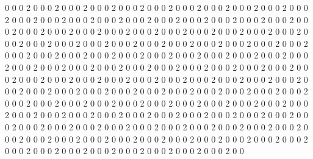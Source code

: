 0
0
0
2
0
0
0
2
0
0
0
2
0
0
0
2
0
0
0
2
0
0
0
2
0
0
0
2
0
0
0
2
0
0
0
2
0
0
0
2
0
0
0
2
0
0
0
2
0
0
0
2
0
0
0
2
0
0
0
2
0
0
0
2
0
0
0
2
0
0
0
2
0
0
0
2
0
0
0
2
0
0
0
2
0
0
0
2
0
0
0
2
0
0
0
2
0
0
0
2
0
0
0
2
0
0
0
2
0
0
0
2
0
0
0
2
0
0
0
2
0
0
0
2
0
0
0
2
0
0
0
2
0
0
0
2
0
0
0
2
0
0
0
2
0
0
0
2
0
0
0
2
0
0
0
2
0
0
0
2
0
0
0
2
0
0
0
2
0
0
0
2
0
0
0
2
0
0
0
2
0
0
0
2
0
0
0
2
0
0
0
2
0
0
0
2
0
0
0
2
0
0
0
2
0
0
0
2
0
0
0
2
0
0
0
2
0
0
0
2
0
0
0
2
0
0
0
2
0
0
0
2
0
0
0
2
0
0
0
2
0
0
0
2
0
0
0
2
0
0
0
2
0
0
0
2
0
0
0
2
0
0
0
2
0
0
0
2
0
0
0
2
0
0
0
2
0
0
0
2
0
0
0
2
0
0
0
2
0
0
0
2
0
0
0
2
0
0
0
2
0
0
0
2
0
0
0
2
0
0
0
2
0
0
0
2
0
0
0
2
0
0
0
2
0
0
0
2
0
0
0
2
0
0
0
2
0
0
0
2
0
0
0
2
0
0
0
2
0
0
0
2
0
0
0
2
0
0
0
2
0
0
0
2
0
0
0
2
0
0
0
2
0
0
0
2
0
0
0
2
0
0
0
2
0
0
0
2
0
0
0
2
0
0
0
2
0
0
0
2
0
0
0
2
0
0
0
2
0
0
0
2
0
0
0
2
0
0
0
2
0
0
0
2
0
0
0
2
0
0
0
2
0
0
0
2
0
0
0
2
0
0
0
2
0
0
0
2
0
0
0
2
0
0
0
2
0
0
0
2
0
0
0
2
0
0
0
2
0
0
0
2
0
0
0
2
0
0
0
2
0
0
0
2
0
0
0
2
0
0
0
2
0
0
0
2
0
0
0
2
0
0
0
2
0
0
0
2
0
0
0
2
0
0
0
2
0
0
0
2
0
0
0
2
0
0
0
2
0
0
0
2
0
0
0
2
0
0
0
2
0
0
0
2
0
0
0
2
0
0
